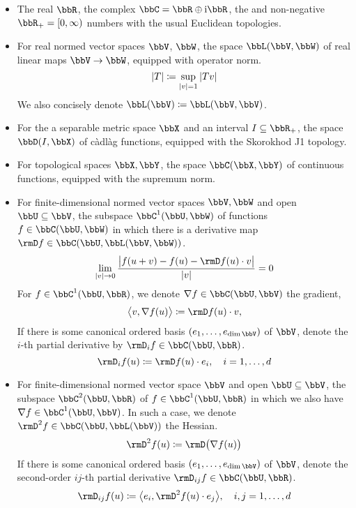 \begin{itemize}
  \item
    The real $\bbR$, the complex $\bbC = \bbR \oplus \im\bbR$, the and non-negative $\bbR_+ = [0,\infty)$ numbers with the usual Euclidean topologies.
  \item
    For real normed vector spaces $\vecSpace$, $\bbW$, the space $\bbL(\vecSpace,\bbW)$ of real linear maps $\vecSpace \rightarrow \bbW$, equipped with operator norm.
    \begin{equation*}
      |T| \coloneqq \sup_{|v|=1} |Tv|
    \end{equation*}
    We also concisely denote $\bbL(\vecSpace) \defeq \bbL(\vecSpace, \vecSpace)$.
  \item
    For the a separable metric space $\stateSpace$ and an interval $I \subseteq \bbR_+$, the space $\pathSpace{I}{\stateSpace}$ of c\`adl\`ag functions, equipped with the Skorokhod J1 topology.
  \item
    For topological spaces $\stateSpace, \bbY$, the space $\cpathSpace{\stateSpace}{\bbY}$ of continuous functions, equipped with the supremum norm.
  \item
    For finite-dimensional normed vector spaces $\vecSpace, \bbW$ and open $\bbU \subseteq \vecSpace$, the subspace $\ccpathSpace{1}{\bbU}{\bbW}$ of functions $f \in \cpathSpace{\bbU}{\bbW}$ in which there is a derivative map $\Der f \in \cpathSpace{\bbU}{\bbL(\vecSpace,\bbW)}$.
    \[
      \lim_{|\vecVar|\rightarrow0} \frac{\big| f(\momentVar + \vecVar) - f(\momentVar) - \Der f(\momentVar) \cdot \vecVar\big|}{|\vecVar|} = 0
    \]
    For $f \in \ccpathSpace{1}{\bbU}{\bbR}$, we denote $\nabla f \in \cpathSpace{\bbU}{\vecSpace}$ the gradient,
    \[
      \bprj{\vecVar}{\nabla f(\momentVar)} \defeq \Der f(\momentVar) \cdot \vecVar,
    \]
    If there is some canonical ordered basis $(\basisVec_1, \ldots, \basisVec_{\operatorname{dim}\vecSpace})$ of $\vecSpace$, denote the $i$-th partial derivative by $\Der_i f \in \cpathSpace{\bbU}{\bbR}$.
    \[
      \Der_i f(\momentVar) \defeq \Der f(\momentVar) \cdot \basisVec_i, \quad i = 1,\ldots, d
    \]
  \item
    For finite-dimensional normed vector space $\vecSpace$ and open $\bbU \subseteq \vecSpace$, the subspace $\ccpathSpace{2}{\bbU}{\bbR}$ of $f \in \ccpathSpace{1}{\bbU}{\bbR}$ in which we also have $\nabla f \in \ccpathSpace{1}{\bbU}{\vecSpace}$.
    In such a case, we denote $\Hess f \in \cpathSpace{\bbU}{\bbL(\vecSpace)}$ the Hessian.
    \[
      \Hess f(\momentVar) \defeq \Der\big( \nabla f(u) \big)
    \]
    If there is some canonical ordered basis $(\basisVec_1, \ldots, \basisVec_{\operatorname{dim}\vecSpace})$ of $\vecSpace$, denote the second-order $ij$-th partial derivative $\Der_{ij} f \in \cpathSpace{\bbU}{\bbR}$.
    \[
      \Der_{ij} f(\momentVar) \defeq \bprj{\basisVec_i}{\Hess f(\momentVar) \cdot \basisVec_j}, \quad i,j = 1, \ldots, d
    \]
\end{itemize}
